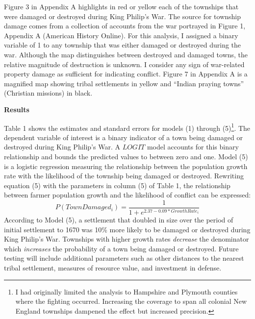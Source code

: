 \documentclass[11pt, oneside]{article}
\begin{document}
Figure 3 in Appendix A highlights in red or yellow each of the townships that were damaged or destroyed during King Philip's War. The source for township damage comes from a collection of accounts from the war portrayed in Figure 1, Appendix A (American History Online). For this analysis, I assigned a binary variable of 1 to any township that was either damaged or destroyed during the war. Although the map distinguishes between destroyed and damaged towns, the relative magnitude of destruction is unknown. I consider any sign of war-related property damage as sufficient for indicating conflict. Figure 7 in Appendix A is a magnified map showing tribal settlements in yellow and ``Indian praying towns'' (Christian missions) in black. 
\pagebreak

\noindent\textbf{Results}

Table 1 shows the estimates and standard errors for models (1) through (5)\footnote{I had originally limited the analysis to Hampshire and Plymouth counties where the fighting occurred. Increasing the coverage to span all colonial New England townships dampened the effect but increased precision.}. The dependent variable of interest is a binary indicator of a town being damaged or destroyed during King Philip's War. A $LOGIT$ model accounts for this binary relationship and bounds the predicted values to between zero and one. Model (5) is a logistic regression measuring the relationship between the population growth rate with the likelihood of the township being damaged or destroyed. Rewriting equation (5) with the parameters in column (5) of Table 1, the relationship between farmer population growth and the likelihood of conflict can be expressed:
\[
P(TownDamaged_{i})=\frac{1}{1+e^{2.37-0.09*GrowthRate_{i}}}
\]
According to Model (5), a settlement that doubled in size over the period of initial settlement to 1670 was 10\% more likely to be damaged or destroyed during King Philip's War. %
Townships with higher growth rates \textit{decrease} the denominator which \textit{increases} the probability of a town being damaged or destroyed. Future testing will include additional parameters such as other distances to the nearest tribal settlement, measures of resource value, and investment in defense. 

\end{document}
